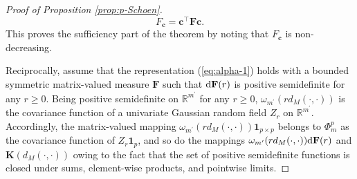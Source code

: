 \documentclass[12pt]{article}
\theoremstyle{plain}
\theoremstyle{remark}
\newcommand{\round}[1]{\left( #1 \right)}
\newcommand{\Cov}[2]{\mathbb{C}{\rm ov}\round{#1,#2}}
\newcommand{\R}[0]{\mathbb{R}}
\newcommand{\onep}[0]{{\mathbf{1}_{p}}}
\newcommand{\onepp}[0]{{\mathbf{1}_{p\times p}}}
\newcommand{\dVec}[1]{{\bm{#1}}}            %
\newcommand{\latMatr}[1]{\mathbf{#1}}          %
\begin{document}
\begin{proof}[Proof of Proposition \ref{prop:p-Schoen}]
    $$ {F_{\dVec{c}} = \dVec{c}^\top \latMatr{F} \dVec{c}}. $$
    This proves the sufficiency part of the theorem by noting that $F_{\dVec{c}}$ is non-decreasing. \par
    {Reciprocally, assume that the representation (\ref{eq:alpha-1}) holds with a bounded symmetric matrix-valued measure $\latMatr{F}$ such that ${\rm d}\latMatr{F}(r)$ is positive semidefinite for any $r \geq 0$. Being positive semidefinite on $\R^{m^\prime}$ for any $r \geq 0$, $\omega_{m^\prime}(r d_M(\cdot,\cdot))$ is the covariance function of a univariate Gaussian random field $Z_r$ on $\R^{m^\prime}$. Accordingly, the matrix-valued mapping $\omega_{m^\prime}(r d_M(\cdot,\cdot)) \onepp$ belongs to $\Phi_m^p$ as the covariance function of $Z_r \onep$, and so do the mappings $\omega_{m^\prime}(r d_M(\cdot,\cdot)) {\rm d}\latMatr{F}(r)$ and $\latMatr{K}(d_M(\cdot,\cdot))$ owing to the fact that the set of positive semidefinite functions is closed under sums, element-wise products, and pointwise limits.}

\end{proof}
\end{document}
